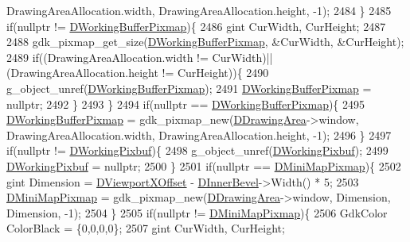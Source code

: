\begin{DoxyCode}
{      DrawingAreaAllocation.width, DrawingAreaAllocation.height, -1);
2484     \}
2485     \textcolor{keywordflow}{if}(\textcolor{keyword}{nullptr} != \hyperlink{classCApplicationData_afa34cf2780f38dd28c0c811e69d60a97}{DWorkingBufferPixmap})\{
2486         gint CurWidth, CurHeight;
2487         
2488         gdk\_pixmap\_get\_size(\hyperlink{classCApplicationData_afa34cf2780f38dd28c0c811e69d60a97}{DWorkingBufferPixmap}, &CurWidth, &CurHeight); 
2489         \textcolor{keywordflow}{if}((DrawingAreaAllocation.width != CurWidth)||(DrawingAreaAllocation.height != CurHeight))\{
2490             g\_object\_unref(\hyperlink{classCApplicationData_afa34cf2780f38dd28c0c811e69d60a97}{DWorkingBufferPixmap});
2491             \hyperlink{classCApplicationData_afa34cf2780f38dd28c0c811e69d60a97}{DWorkingBufferPixmap} = \textcolor{keyword}{nullptr};
2492         \}
2493     \}
2494     \textcolor{keywordflow}{if}(\textcolor{keyword}{nullptr} == \hyperlink{classCApplicationData_afa34cf2780f38dd28c0c811e69d60a97}{DWorkingBufferPixmap})\{
2495         \hyperlink{classCApplicationData_afa34cf2780f38dd28c0c811e69d60a97}{DWorkingBufferPixmap} = gdk\_pixmap\_new(\hyperlink{classCApplicationData_a4735f5d31632313e0b2a1659eb178987}{DDrawingArea}->window, 
      DrawingAreaAllocation.width, DrawingAreaAllocation.height, -1);
2496     \}
2497     \textcolor{keywordflow}{if}(\textcolor{keyword}{nullptr} != \hyperlink{classCApplicationData_a19355c8cf25f216019db728219185119}{DWorkingPixbuf})\{
2498         g\_object\_unref(\hyperlink{classCApplicationData_a19355c8cf25f216019db728219185119}{DWorkingPixbuf});
2499         \hyperlink{classCApplicationData_a19355c8cf25f216019db728219185119}{DWorkingPixbuf} = \textcolor{keyword}{nullptr};
2500     \}
2501     \textcolor{keywordflow}{if}(\textcolor{keyword}{nullptr} == \hyperlink{classCApplicationData_abe3af81659ead5113b7b2f165a88e737}{DMiniMapPixmap})\{
2502         gint Dimension = \hyperlink{classCApplicationData_a306bba873ccc47126111305fe21ef3ff}{DViewportXOffset} - \hyperlink{classCApplicationData_a29a687c44dceb9e87a56d96612d59ab5}{DInnerBevel}->Width() * 5;
2503         \hyperlink{classCApplicationData_abe3af81659ead5113b7b2f165a88e737}{DMiniMapPixmap} = gdk\_pixmap\_new(\hyperlink{classCApplicationData_a4735f5d31632313e0b2a1659eb178987}{DDrawingArea}->window, Dimension, 
      Dimension, -1);   
2504     \}
2505     \textcolor{keywordflow}{if}(\textcolor{keyword}{nullptr} != \hyperlink{classCApplicationData_abe3af81659ead5113b7b2f165a88e737}{DMiniMapPixmap})\{
2506         GdkColor ColorBlack = \{0,0,0,0\};
2507         gint CurWidth, CurHeight;
}
\end{DoxyCode}

